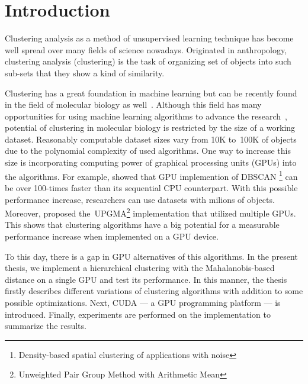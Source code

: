 \chapter*{Introduction}


Clustering analysis as a method of unsupervised learning technique has become well spread over many fields of science nowadays. Originated in anthropology, clustering analysis (clustering) is the task of organizing set of objects into such sub-sets that they show a kind of similarity. 

Clustering has a great foundation in machine learning but can be recently found in the field of molecular biology as well~\cite{Nugent2010}. Although this field has many opportunities for using machine learning algorithms to advance the research~\cite{btaa091}, potential of clustering in molecular biology is restricted by the size of a working dataset. Reasonably computable dataset sizes vary from 10K to~100K of objects due to the polynomial complexity of used algorithms. One way to increase this size is incorporating computing power of graphical processing units (GPUs) into the algorithms. For example, \citet{andrade2013g} showed that GPU implemention of DBSCAN \footnote{Density-based spatial clustering of applications with noise} can be over 100-times faster than its sequential CPU counterpart. With this possible performance increase, researchers can use datasets with milions of objects. Moreover, \citet{hua2017mgupgma} proposed the~UPGMA\footnote{Unweighted Pair Group Method with Arithmetic Mean} implementation that utilized multiple GPUs. This shows that clustering algorithms have a big potential for a measurable performance increase when implemented on a GPU device.

To this day, there is a gap in GPU alternatives of this algorithms. In the present thesis, we implement a hierarchical clustering with the Ma\-ha\-la\-no\-bis-based distance on a single GPU and test its performance. In this manner, the thesis firstly describes different variations of clustering algorithms with addition to some possible optimizations. Next, CUDA --- a GPU programming platform --- is introduced. Finally, experiments are performed on the implementation to summarize the results.
